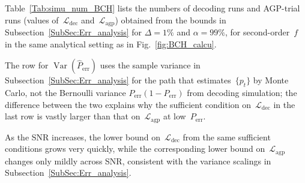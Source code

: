 \documentclass[letterpaper,draftclsnofoot,onecolumn]{IEEEtran}
\begin{document}
Table~\ref{Tab:simu_num_BCH} lists the numbers of decoding runs and AGP-trial runs (values of~$\mathcal{L}_{\text{dec}}$ and~$\mathcal{L}_{\text{agp}}$) obtained from the bounds in Subsection~\ref{SubSec:Err_analysis} for $\Delta = 1\%$ and $\alpha = 99\%$, for second-order~$f$ in the same analytical setting as in Fig.~\ref{fig:BCH_calcu}.

The row for $\operatorname{Var}(\hat{P}_{\text{err}})$ uses the sample variance in Subsection~\ref{SubSec:Err_analysis} for the path that estimates~$\{p_t\}$ by Monte Carlo, not the Bernoulli variance $P_{\text{err}}(1-P_{\text{err}})$ from decoding simulation; the difference between the two explains why the sufficient condition on~$\mathcal{L}_{\text{dec}}$ in the last row is vastly larger than that on~$\mathcal{L}_{\text{agp}}$ at low~$P_{\text{err}}$.

As the SNR increases, the lower bound on~$\mathcal{L}_{\text{dec}}$ from the same sufficient conditions grows very quickly, while the corresponding lower bound on~$\mathcal{L}_{\text{agp}}$ changes only mildly across SNR, consistent with the variance scalings in Subsection~\ref{SubSec:Err_analysis}.

\end{document}
